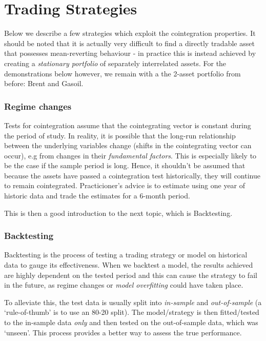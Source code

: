 \documentclass{article}
\begin{document}
    \section{Trading Strategies}\label{trading-strategies}

    Below we describe a few strategies which exploit the cointegration
properties. It should be noted that it is actually very difficult to
find a directly tradable asset that possesses mean-reverting behaviour -
in practice this is instead achieved by creating a \emph{stationary
portfolio} of separately interrelated assets. For the demonstrations
below however, we remain with a the 2-asset portfolio from before: Brent
and Gasoil.

    \subsubsection{Regime changes}\label{regime-changes}

Tests for cointegration assume that the cointegrating vector is constant
during the period of study. In reality, it is possible that the long-run
relationship between the underlying variables change (shifts in the
cointegrating vector can occur), e.g from changes in their
\emph{fundamental factors}. This is especially likely to be the case if
the sample period is long. Hence, it shouldn't be assumed that because
the assets have passed a cointegration test historically, they will
continue to remain cointegrated. Practicioner's advice is to estimate
using one year of historic data and trade the estimates for a 6-month
period.

This is then a good introduction to the next topic, which is
Backtesting.

    \subsubsection{Backtesting}\label{backtesting}

Backtesting is the process of testing a trading strategy or model on
historical data to gauge its effectiveness. When we backtest a model,
the results achieved are highly dependent on the tested period and this
can cause the strategy to fail in the future, as regime changes or
\emph{model overfitting} could have taken place.

To alleviate this, the test data is usually split into \emph{in-sample}
and \emph{out-of-sample} (a `rule-of-thumb' is to use an 80-20 split).
The model/strategy is then fitted/tested to the in-sample data
\emph{only} and then tested on the out-of-sample data, which was
`unseen'. This process provides a better way to assess the true
performance.
\end{document}
